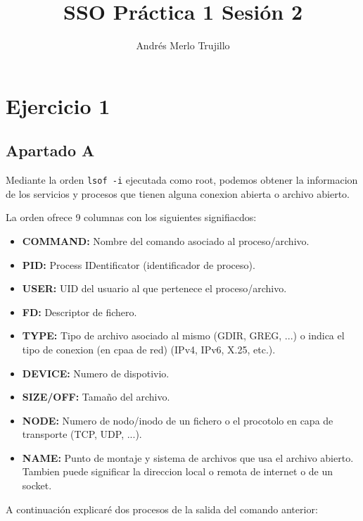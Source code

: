 \documentclass{article}
\title{SSO Práctica 1 Sesión 2}
\author{Andrés Merlo Trujillo}
\date{}
\begin{document}
\maketitle

\tableofcontents

\newpage
{}
\section*{Ejercicio 1}

\subsection*{Apartado A}
Mediante la orden \verb|lsof -i| ejecutada como root, podemos obtener la informacion de los servicios y procesos que tienen alguna conexion abierta o archivo abierto.


La orden ofrece 9 columnas con los siguientes signifiacdos:

\begin{itemize}
    \item \textbf{COMMAND: }Nombre del comando asociado al proceso/archivo.
    \item \textbf{PID: }Process IDentificator (identificador de proceso).
    \item \textbf{USER: }UID del usuario al que pertenece el proceso/archivo.
    \item \textbf{FD: }Descriptor de fichero.
    \item \textbf{TYPE: }Tipo de archivo asociado al mismo (GDIR, GREG, ...) o indica el tipo de conexion (en cpaa de red) (IPv4, IPv6, X.25, etc.).
    \item \textbf{DEVICE: }Numero de dispotivio.
    \item \textbf{SIZE/OFF: }Tamaño del archivo.
    \item \textbf{NODE: }Numero de nodo/inodo de un fichero o el procotolo en capa de transporte (TCP, UDP, ...).
    \item \textbf{NAME: }Punto de montaje y sistema de archivos que usa el archivo abierto. Tambien puede significar la direccion local o remota de internet o de un socket.
\end{itemize}

A continuación explicaré dos procesos de la salida del comando anterior:

\end{document}
